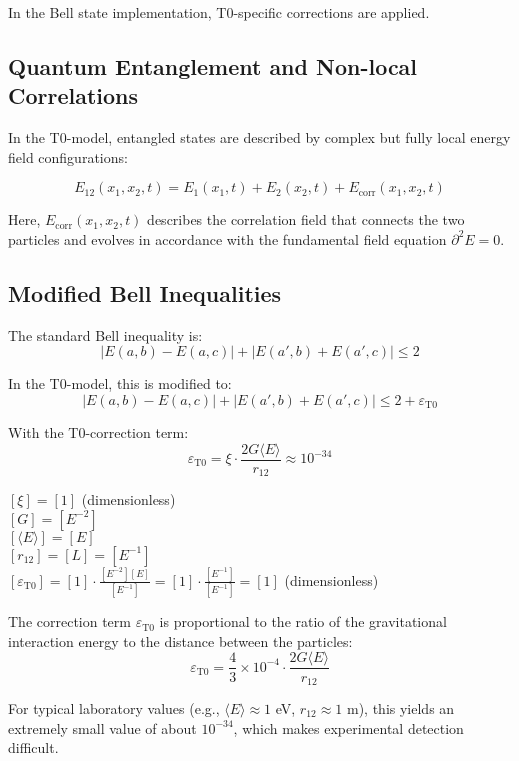 \documentclass[12pt,a4paper]{article}
\newcommand{\epst}{\varepsilon_{\text{T0}}}
\theoremstyle{definition}
\begin{document}
	In the Bell state implementation, T0-specific corrections are applied.
	
	
	\subsection{Quantum Entanglement and Non-local Correlations}
	
	In the T0-model, entangled states are described by complex but fully local energy field configurations:
	
	\begin{equation}
		E_{12}(x_1,x_2,t) = E_1(x_1,t) + E_2(x_2,t) + E_{\text{corr}}(x_1,x_2,t)
	\end{equation}
	
	Here, $E_{\text{corr}}(x_1,x_2,t)$ describes the correlation field that connects the two particles and evolves in accordance with the fundamental field equation $\partial^2 E = 0$.
	
	\subsection{Modified Bell Inequalities}
	
	The standard Bell inequality is:
	\begin{equation}
		|E(a,b) - E(a,c)| + |E(a',b) + E(a',c)| \leq 2
	\end{equation}
	
	In the T0-model, this is modified to:
	\begin{equation}
		\boxed{|E(a,b) - E(a,c)| + |E(a',b) + E(a',c)| \leq 2 + \epst}
	\end{equation}
	
	With the T0-correction term:
	\begin{equation}
		\epst = \xi \cdot \frac{2G\langle E \rangle}{r_{12}} \approx 10^{-34}
	\end{equation}
	
	\begin{einheitencheck}
		$[\xi] = [1]$ (dimensionless)\\
		$[G] = [E^{-2}]$\\
		$[\langle E \rangle] = [E]$\\
		$[r_{12}] = [L] = [E^{-1}]$\\
		$[\epst] = [1] \cdot \frac{[E^{-2}][E]}{[E^{-1}]} = [1] \cdot \frac{[E^{-1}]}{[E^{-1}]} = [1]$ (dimensionless) \checkmark
	\end{einheitencheck}
	
	\begin{verhaltnis}
		The correction term $\epst$ is proportional to the ratio of the gravitational interaction energy to the distance between the particles:
		\begin{equation}
			\epst = \frac{4}{3} \times 10^{-4} \cdot \frac{2G\langle E \rangle}{r_{12}}
		\end{equation}
		
		For typical laboratory values (e.g., $\langle E \rangle \approx 1$ eV, $r_{12} \approx 1$ m), this yields an extremely small value of about $10^{-34}$, which makes experimental detection difficult.
	\end{verhaltnis}
	
\end{document}
